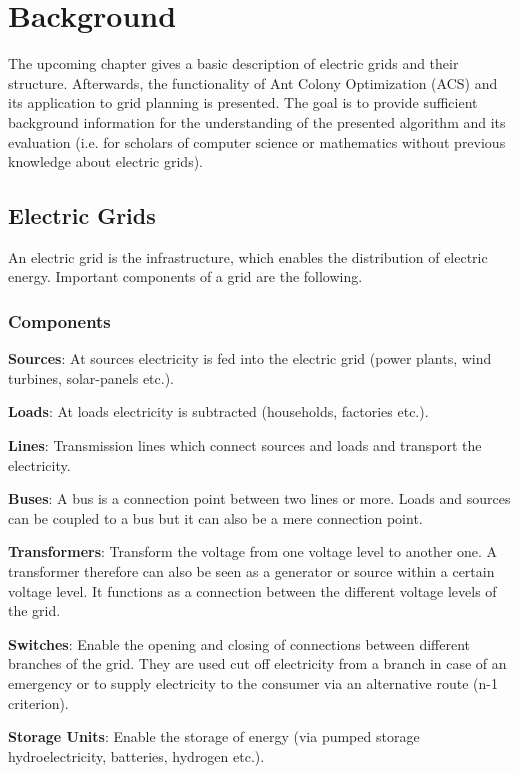 \chapter{Background}\label{chap:background}
The upcoming chapter gives a basic description of electric grids and their structure. Afterwards, the functionality of Ant Colony Optimization (ACS) and its application to grid planning is presented. The goal is to provide sufficient background information for the understanding of the presented algorithm and its evaluation (i.e. for scholars of computer science or mathematics without previous knowledge about electric grids).

\section{Electric Grids}
An electric grid is the infrastructure, which enables the distribution of electric energy. Important components of a grid are the following.

\subsection{Components}\label{sec:components}

\textbf{Sources}: At sources electricity is fed into the electric grid (power plants, wind turbines, solar-panels etc.).

\textbf{Loads}: At loads electricity is subtracted (households, factories etc.).

\textbf{Lines}: Transmission lines which connect sources and loads and transport the electricity.

\textbf{Buses}: A bus is a connection point between two lines or more. Loads and sources can be coupled to a bus but it can also be a mere connection point.

\textbf{Transformers}: Transform the voltage from one voltage level to another one. A transformer therefore can also be seen as a generator or source within a certain voltage level. It functions as a connection between the different voltage levels of the grid.

\textbf{Switches}: Enable the opening and closing of connections between different branches of the grid. They are used cut off electricity from a branch in case of an emergency or to supply electricity to the consumer via an alternative route (n-1 criterion).

\textbf{Storage Units}: Enable the storage of energy (via pumped storage hydroelectricity, batteries, hydrogen etc.). 


